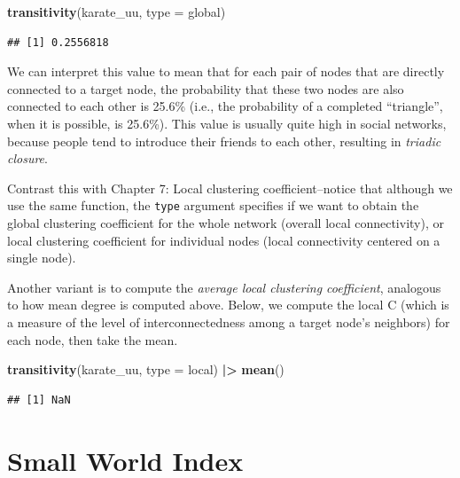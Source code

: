 \documentclass[
]{book}
\newenvironment{Shaded}{\begin{snugshade}}{\end{snugshade}}
\newcommand{\AttributeTok}[1]{\textcolor[rgb]{0.13,0.29,0.53}{#1}}
\newcommand{\FunctionTok}[1]{\textcolor[rgb]{0.13,0.29,0.53}{\textbf{#1}}}
\newcommand{\NormalTok}[1]{#1}
\newcommand{\SpecialCharTok}[1]{\textcolor[rgb]{0.81,0.36,0.00}{\textbf{#1}}}
\newcommand{\StringTok}[1]{\textcolor[rgb]{0.31,0.60,0.02}{#1}}
\begin{document}
\begin{Shaded}
\begin{Highlighting}[]
\FunctionTok{transitivity}\NormalTok{(karate\_uu, }\AttributeTok{type =} \StringTok{\textquotesingle{}global\textquotesingle{}}\NormalTok{)}
\end{Highlighting}
\end{Shaded}

\begin{verbatim}
## [1] 0.2556818
\end{verbatim}

We can interpret this value to mean that for each pair of nodes that are directly connected to a target node, the probability that these two nodes are also connected to each other is 25.6\% (i.e., the probability of a completed ``triangle'', when it is possible, is 25.6\%). This value is usually quite high in social networks, because people tend to introduce their friends to each other, resulting in \emph{triadic closure}.

Contrast this with Chapter 7: Local clustering coefficient--notice that although we use the same function, the \texttt{type} argument specifies if we want to obtain the global clustering coefficient for the whole network (overall local connectivity), or local clustering coefficient for individual nodes (local connectivity centered on a single node).

Another variant is to compute the \emph{average local clustering coefficient}, analogous to how mean degree is computed above. Below, we compute the local C (which is a measure of the level of interconnectedness among a target node's neighbors) for each node, then take the mean.

\begin{Shaded}
\begin{Highlighting}[]
\FunctionTok{transitivity}\NormalTok{(karate\_uu, }\AttributeTok{type =} \StringTok{\textquotesingle{}local\textquotesingle{}}\NormalTok{) }\SpecialCharTok{|\textgreater{}} \FunctionTok{mean}\NormalTok{()}
\end{Highlighting}
\end{Shaded}

\begin{verbatim}
## [1] NaN
\end{verbatim}

\section{Small World Index}\label{small-world-index}
\end{document}
